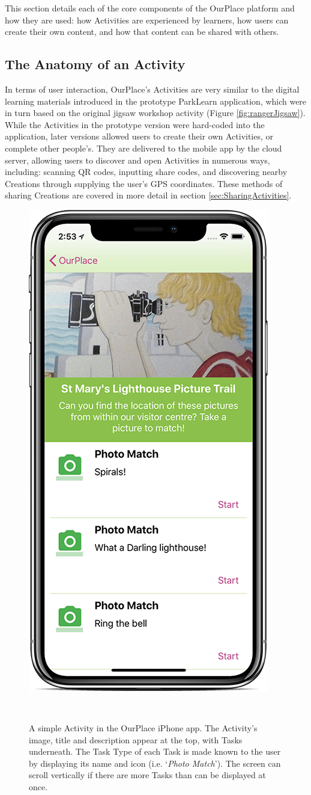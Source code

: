 This section details each of the core components of the OurPlace platform and how they are used: how Activities are experienced by learners, how users can create their own content, and how that content can be shared with others.

\subsection{The Anatomy of an Activity}
\label{sec:ActivityOverview}
In terms of user interaction, OurPlace's Activities are very similar to the digital learning materials introduced in the prototype ParkLearn application, which were in turn based on the original jigsaw workshop activity (Figure \ref{fig:rangerJigsaw}). While the Activities in the prototype version were hard-coded into the application, later versions allowed users to create their own Activities, or complete other people's. They are delivered to the mobile app by the cloud server, allowing users to discover and open Activities in numerous ways, including: scanning QR codes, inputting share codes, and discovering nearby Creations through supplying the user's GPS coordinates. These methods of sharing Creations are covered in more detail in section \ref{sec:SharingActivities}. 

\begin{figure}
  \centering
  \includegraphics[width=0.45\columnwidth]{images/chapter05/activity.png}
  \caption[A simple OurPlace Activity]{ A simple Activity in the OurPlace iPhone app. The Activity's image, title and description appear at the top, with Tasks underneath. The Task Type of each Task is made known to the user by displaying its name and icon (i.e. `\textit{Photo Match}'). The screen can scroll vertically if there are more Tasks than can be displayed at once.}~\label{fig:ActivityExample}
\end{figure}

